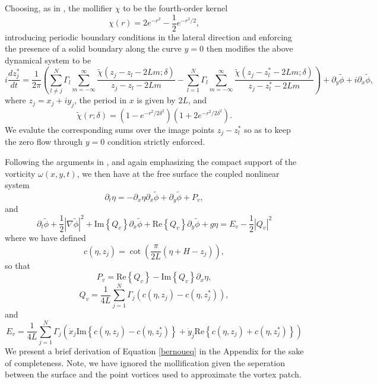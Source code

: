 \documentclass[a4paper,11pt]{article}
\newcommand{\p}{\partial}
\begin{document}
Choosing, as in \cite{beale}, the mollifier $\chi$ to be the fourth-order kernel 
\[
\chi(r) = 2e^{-r^{2}} - \frac{1}{2}e^{-r^2/2}, 
\]
introducing periodic boundary conditions in the lateral direction and enforcing the presence of a solid boundary along the curve $y=0$ then modifies the above dynamical system to be 
\[
i\frac{d z^{\ast}_{j}}{dt}  = \frac{1}{2\pi}\left(\sum_{l\neq j}^{N} \Gamma_{l} \sum_{m=-\infty}^{\infty} \frac{\tilde{\chi}(z_{j}-z_{l}-2Lm;\delta)}{z_{j}-z_{l}-2Lm} -   \sum_{l=1}^{N} \Gamma_{l} \sum_{m=-\infty}^{\infty} \frac{\tilde{\chi}(z_{j}-z^{\ast}_{l}-2Lm;\delta)}{z_{j}-z^{\ast}_{l}-2Lm}\right)  + \p_{y}\tilde{\phi} + i\p_{x}\tilde{\phi}, 
\]
where $z_{j}=x_{j} + iy_{j}$, the period in $x$ is given by $2L$, and
\[
\tilde{\chi}(r;\delta) = \left(1-e^{-r^{2}/2\delta^{2}} \right)\left(1+2e^{-r^{2}/2\delta^{2}} \right).
\]
We evalute the corresponding sums over the image points $z_{j}-z_{l}^{\ast}$ so as to keep the zero flow through $y=0$ condition strictly enforced.  

Following the arguments in \cite{curtis}, and again emphasizing the compact support of the vorticity $\omega(x,y,t)$, we then have at the free surface the coupled nonlinear system
\[
\p_{t}\eta = -\p_{x}\eta\p_{x}\tilde{\phi} + \p_{y}\tilde{\phi} + P_{v},
\]
and
\begin{equation}
\p_{t}\tilde{\phi} + \frac{1}{2}\left|\nabla \tilde{\phi}\right|^{2} +\mbox{Im}\left\{Q_{v}\right\}\p_{x}\tilde{\phi} + \mbox{Re}\left\{Q_{v}\right\}\p_{y}\tilde{\phi} + g\eta = E_{v} - \frac{1}{2}\left|Q_{v}\right|^{2} 
\label{bernoueq}
\end{equation}
where we have defined
\[
c(\eta,z_{j}) = \cot\left(\frac{\pi}{2L}\left(\eta+H-z_{j}\right)\right),
\]
so that 
\[
P_{v} = \mbox{Re}\left\{Q_{v}\right\} - \mbox{Im}\left\{Q_{v}\right\}\p_{x}\eta , 
\]
\[
Q_{v} = \frac{1}{4L}\sum_{j=1}^{N}\Gamma_{j}\left(c(\eta,z_{j}) - c(\eta,z^{\ast}_{j})\right),
\]
and
\[
E_{v} = \frac{1}{4L}\sum_{j=1}^{N}\Gamma_{j}\left(\dot{x}_{j}\mbox{Im}\left\{c(\eta,z_{j})-c(\eta,z^{\ast}_{j})\right\} + \dot{y}_{j}\mbox{Re}\left\{c(\eta,z_{j})+c(\eta,z^{\ast}_{j})\right\}\right)
\]
We present a brief derivation of Equation \eqref{bernoueq} in the Appendix for the sake of completeness.  Note, we have ignored the mollification given the seperation between the surface and the point vortices used to approximate the vortex patch.  
\end{document}
